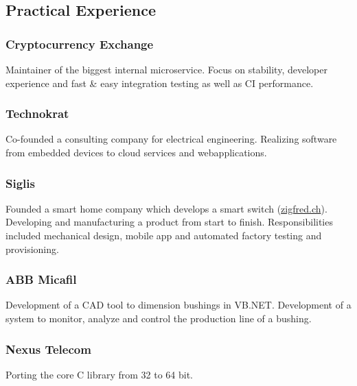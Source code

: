     \begin{timeline}
    
    
    \subsection{Practical Experience}

    \subsubsection{Cryptocurrency Exchange}
    Maintainer of the biggest internal microservice.
    Focus on stability, developer experience and fast \& easy integration testing as well as CI performance.
    \sectionsep
    
    \subsubsection{Technokrat}
    Co-founded a consulting company for electrical engineering. Realizing software from embedded devices to cloud services and webapplications.
    \sectionsep

    \subsubsection{Siglis}
    Founded a smart home company which develops a smart switch (\href{https://zigfred.ch}{zigfred.ch}).
    Developing and manufacturing a product from start to finish. Responsibilities included mechanical design, mobile app and automated factory testing and provisioning.
    \sectionsep

    \subsubsection{ABB Micafil}
    Development of a CAD tool to dimension bushings in VB.NET.
    Development of a system to monitor, analyze and control the production line of a bushing.
    \sectionsep
    
    \subsubsection{Nexus Telecom}
    Porting the core C library from 32 to 64 bit.
    \sectionsep


\end{timeline}
